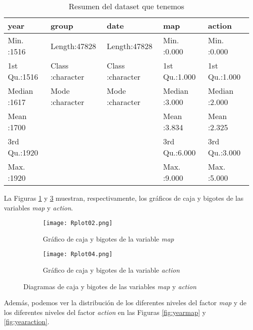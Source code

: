 \documentclass[10pt,a4paper]{article}
\begin{document}
\begin{table}[ht]
\centering
\begin{tabular}{lllll}
  \hline
     year &    group &     date &      map &     action \\ 
  \hline
Min.   :1516   & Length:47828       & Length:47828       & Min.   :0.000   & Min.   :0.000   \\ 
  1st Qu.:1516   & Class :character   & Class :character   & 1st Qu.:1.000   & 1st Qu.:1.000   \\ 
  Median :1617   & Mode  :character   & Mode  :character   & Median :3.000   & Median :2.000   \\ 
  Mean   :1700   &  &  & Mean   :3.834   & Mean   :2.325   \\ 
  3rd Qu.:1920   &  &  & 3rd Qu.:6.000   & 3rd Qu.:3.000   \\ 
  Max.   :1920   &  &  & Max.   :9.000   & Max.   :5.000   \\ 
   \hline
\end{tabular}
\caption{Resumen del dataset que tenemos}
\label{table:2}
\end{table}

La Figuras \ref{fig:boxplotmap} y \ref{fig:boxplotaction} muestran, respectivamente, los gráficos de caja y bigotes de las variables \emph{map} y \emph{action}.

\begin{figure}[!tbp]
  \begin{subfigure}[b]{0.49\textwidth}
    \texttt{[image: Rplot02.png]}
    \caption{Gráfico de caja y bigotes de la variable \emph{map}}
    \label{fig:boxplotmap}
  \end{subfigure}
  \hfill
  \begin{subfigure}[b]{0.49\textwidth}
    \texttt{[image: Rplot04.png]}
    \caption{Gráfico de caja y bigotes de la variable \emph{action}}
    \label{fig:boxplotaction}
  \end{subfigure}
  \caption{Diagramas de caja y bigotes de las variables \emph{map} y \emph{action}}
\end{figure}

Además, podemos ver la distribución de los diferentes niveles del factor \emph{map} y de los diferentes niveles del factor \emph{action} en las Figuras \ref{fig:yearmap} y \ref{fig:yearaction}.
\end{document}
